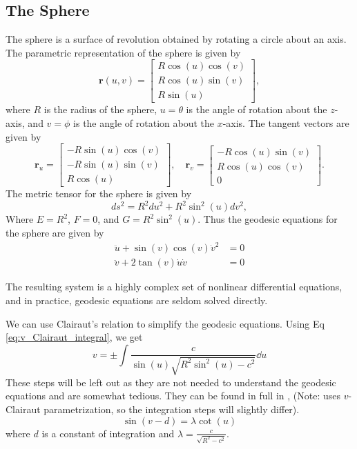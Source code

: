 \documentclass[12pt]{article}
\begin{document}
\subsection{The Sphere}

The sphere is a surface of revolution obtained by rotating a circle about an axis.
The parametric representation of the sphere is given by
\[
    \mathbf{r}(u, v) = \begin{bmatrix} R \cos (u) \cos (v) \\ R \cos (u) \sin (v) \\ R \sin (u) \end{bmatrix},
\]
where \(R\) is the radius of the sphere, \(u = \theta\) is the angle of rotation about the \(z\)-axis, and \(v = \phi\) is the angle of rotation about the \(x\)-axis.
The tangent vectors are given by
\[
    \mathbf{r}_u = \begin{bmatrix} -R \sin (u) \cos (v) \\ -R \sin (u) \sin (v) \\ R \cos (u) \end{bmatrix}, \quad \mathbf{r}_v = \begin{bmatrix} -R \cos (u) \sin (v) \\ R \cos (u) \cos (v) \\ 0 \end{bmatrix}.
\]
The metric tensor for the sphere is given by
\[
    ds^2 = R^2 du^2 + R^2 \sin^2 (u) dv^2,
\]
Where \(E = R^2 \), \(F = 0\), and \(G = R^2 \sin^2 (u)\).
Thus the geodesic equations for the sphere are given by
\begin{align*}
    \ddot{u} + \sin(v) \cos(v) \dot{v}^2 &= 0 \\
    \ddot{v} + 2\tan(v) \dot{u} \dot{v} &= 0 
\end{align*}

The resulting system is a highly complex set of nonlinear differential equations, and in practice, geodesic equations are seldom solved directly.

We can use Clairaut's relation to simplify the geodesic equations.
Using Eq \eqref{eq:v_Clairaut_integral}, we get 
\[
    v = \pm \int \frac{c}{\sin(u)\sqrt{R^2\sin^{2}(u) - c^{2}}} \dd{u}
\]
These steps will be left out as they are not needed to understand the geodesic equations and are somewhat tedious. 
They can be found in full in \cite{Oprea2007}, (Note: \cite{Oprea2007} uses $v$-Clairaut parametrization, so the integration steps will slightly differ).
\[
\sin(v - d) = \lambda \cot(u)
\]
where \(d\) is a constant of integration and \(\lambda = \frac{c}{\sqrt{R^2 - c^2}}\).
\end{document}
